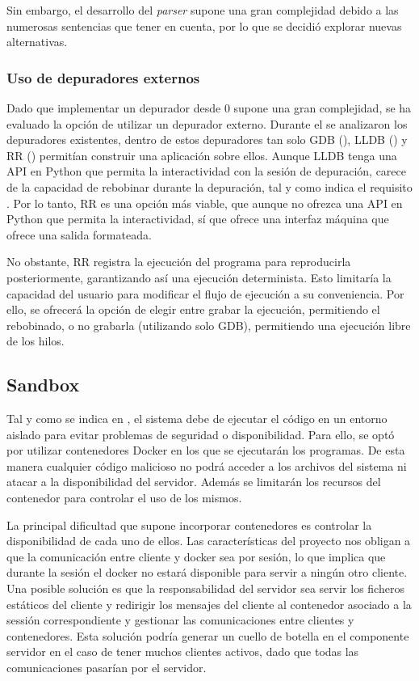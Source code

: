 Sin embargo, el desarrollo del \textit{\gls{parser}} supone una gran complejidad debido a las numerosas sentencias que tener en cuenta, por lo que se decidió explorar nuevas alternativas.

\subsubsection{Uso de depuradores externos} \label{subsec:depuradores-externos}

Dado que implementar un depurador desde 0 supone una gran complejidad, se ha evaluado la opción de utilizar un depurador externo. Durante el  se analizaron los depuradores existentes, dentro de estos depuradores tan solo GDB (), LLDB () y RR () permitían construir una aplicación sobre ellos. Aunque LLDB tenga una API en Python que permita la interactividad con la sesión de depuración, carece de la capacidad de rebobinar durante la depuración, tal y como indica el requisito . Por lo tanto, RR es una opción más viable, que aunque no ofrezca una API en Python que permita la interactividad, sí que ofrece una interfaz máquina que ofrece una salida formateada.

No obstante, RR registra la ejecución del programa para reproducirla posteriormente, garantizando así una ejecución determinista. Esto limitaría la capacidad del usuario para modificar el flujo de ejecución a su conveniencia. Por ello, se ofrecerá la opción de elegir entre grabar la ejecución, permitiendo el rebobinado, o no grabarla (utilizando solo GDB), permitiendo una ejecución libre de los hilos.

\subsection{Sandbox} \label{subsec:sandbox}

Tal y como se indica en , el sistema debe de ejecutar el código en un entorno aislado para evitar problemas de seguridad o disponibilidad. Para ello, se optó por utilizar contenedores Docker en los que se ejecutarán los programas. De esta manera cualquier código malicioso no podrá acceder a los archivos del sistema ni atacar a la disponibilidad del servidor. Además se limitarán los recursos del contenedor para controlar el uso de los mismos.

La principal dificultad que supone incorporar contenedores es controlar la disponibilidad de cada uno de ellos. Las características del proyecto nos obligan a que la comunicación entre cliente y docker sea por sesión, lo que implica que durante la sesión el docker no estará disponible para servir a ningún otro cliente. Una posible solución es que la responsabilidad del servidor sea servir los ficheros estáticos del cliente y redirigir los mensajes del cliente al contenedor asociado a la sessión correspondiente y gestionar las comunicaciones entre clientes y contenedores. Esta solución podría generar un cuello de botella en el componente servidor en el caso de tener muchos clientes activos, dado que todas las comunicaciones pasarían por el servidor.

